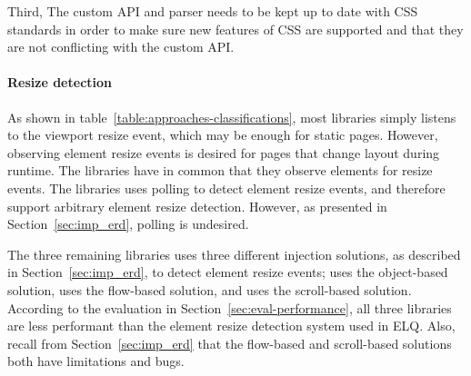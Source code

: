 \documentclass[a4paper,11pt]{kth-mag}
\begin{document}
    Third, The custom \gls{API} and parser needs to be kept up to date with \gls{CSS} standards in order to make sure new features of \gls{CSS} are supported and that they are not conflicting with the custom \gls{API}.

    \paragraph{Resize detection}
    As shown in table~\ref{table:approaches-classifications}, most libraries simply listens to the \gls{viewport} resize event, which may be enough for static pages.
    However, observing element resize events is desired for pages that change layout during runtime.
    The libraries \cite{eq_imp_localised-css,eq_imp_selector_queries,eq_imp_prollyfill-min-width,eq_imp_gss,eq_imp_element-queries,eq_imp_css-element-queries} have in common that they observe \glspl{element} for resize events.
    The libraries \cite{eq_imp_localised-css,eq_imp_selector_queries} uses polling to detect element resize events, and therefore support arbitrary element resize detection.
    However, as presented in Section~\ref{sec:imp_erd}, polling is undesired.

    The three remaining libraries uses three different injection solutions, as described in Section~\ref{sec:imp_erd}, to detect element resize events; \cite{eq_imp_element-queries} uses the object-based solution, \cite{eq_imp_prollyfill-min-width} uses the flow-based solution, and \cite{eq_imp_css-element-queries} uses the scroll-based solution.
    According to the evaluation in Section~\ref{sec:eval-performance}, all three libraries are less performant than the element resize detection system used in \gls{ELQ}.
    Also, recall from Section~\ref{sec:imp_erd} that the flow-based and scroll-based solutions both have limitations and bugs.
\end{document}
